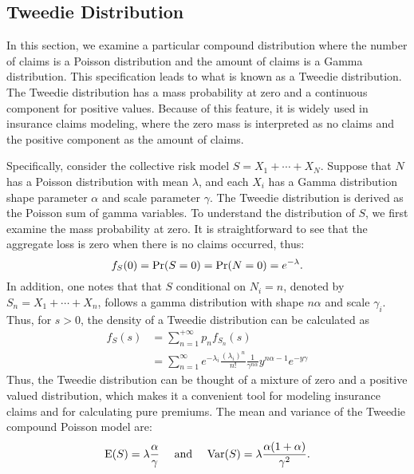 \documentclass[12pt,letterpaper]{article}
\begin{document}
\subsection{Tweedie Distribution}

In this section, we examine a particular compound distribution where the number of claims is a Poisson distribution and the amount of claims is a Gamma distribution. This specification leads to what is known as a Tweedie distribution. The Tweedie distribution has a mass probability at zero and a continuous component for positive values. Because of this feature, it is widely used in insurance claims modeling, where the zero mass is interpreted as no claims and the positive component as the amount of claims.

Specifically, consider the collective risk model $S=X_1+\cdots+X_N$. Suppose that $N$ has a Poisson distribution with mean $\lambda$, and each $X_i$ has a Gamma distribution shape parameter $\alpha$ and scale parameter $\gamma$. The Tweedie distribution is derived as the Poisson sum of gamma variables. To understand the distribution of $S$, we first examine the mass probability at zero. It is straightforward to see that the aggregate loss is zero when there is no claims occurred, thus:
$$f_S(0)={\rm Pr}(S=0)= {\rm Pr}(N=0)=e^{-\lambda}.$$
In addition, one notes that that $S$ conditional on $N_i=n$, denoted by $S_n=X_1+\cdots+X_n$, follows a gamma distribution with shape $n\alpha$ and scale $\gamma_i$. Thus, for $s>0$, the density of a Tweedie distribution can be calculated as
\begin{align*}
f_S(s)&=\sum_{n=1}^{+\infty} p_n f_{S_n}(s)\\
&=\sum_{n=1}^{\infty}e^{-\lambda_i}\frac{(\lambda_i)^n}{n!}\frac{1}{\gamma^{n\alpha}}y^{n\alpha-1}e^{-y\gamma}
\end{align*}
Thus, the Tweedie distribution can be thought of a mixture of zero and a positive valued distribution, which makes it a convenient tool for modeling insurance claims and for calculating pure premiums. The mean and variance of the Tweedie compound Poisson model are:
$${\rm E} (S)=\lambda\frac{\alpha}{\gamma}~~~~{\rm and}~~~~{\rm Var} (S)=\lambda\frac{\alpha(1+\alpha)}{\gamma^2}.$$
\end{document}
